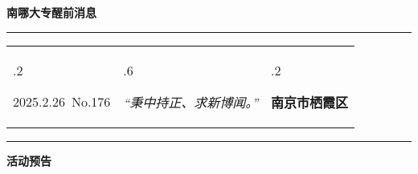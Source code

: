 \documentclass[letterpaper, 12pt]{article}
\begin{document}
\begin{center}
    \Huge\textbf{南哪大专醒前消息}
\end{center}
\vspace{4mm}
\hrule
\renewcommand\tabularxcolumn[1]{m{#1}}
\begin{tabularx}{\textwidth}{>{\hsize.2\hsize}X>{\hsize.6\hsize}X>{\hsize.2\hsize}X}
    \begin{flushleft}
        2025.2.26\, No.176
    \end{flushleft}
    &
    \begin{center}
        \textit{“秉中持正、求新博闻。”}
    \end{center}
    &
    \begin{flushright}
        \textbf{南京市栖霞区}
    \end{flushright}
\end{tabularx}
\vspace{-3.5mm}
\hrule
\vspace{4mm}
\centerline{\huge\textbf{活动预告}}
\end{document}
